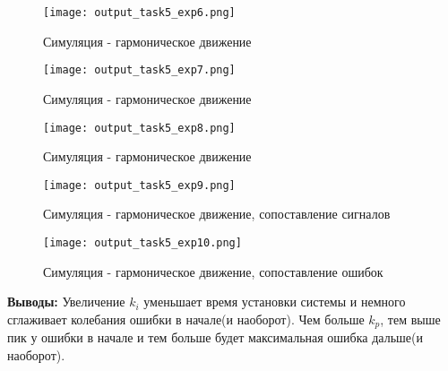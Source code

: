\begin{figure}[ht]
  \centering
  \texttt{[image: output\_task5\_exp6.png]}
\caption{Симуляция - гармоническое движение}
\end{figure}

\newpage
\begin{figure}[ht]
  \centering
  \texttt{[image: output\_task5\_exp7.png]}
\caption{Симуляция - гармоническое движение}
\end{figure}

\begin{figure}[ht]
  \centering
  \texttt{[image: output\_task5\_exp8.png]}
\caption{Симуляция - гармоническое движение}
\end{figure}

\newpage
\begin{figure}[ht]
  \centering
  \texttt{[image: output\_task5\_exp9.png]}
\caption{Симуляция - гармоническое движение, сопоставление сигналов}
\end{figure}

\begin{figure}[ht]
  \centering
  \texttt{[image: output\_task5\_exp10.png]}
\caption{Симуляция - гармоническое движение, сопоставление ошибок}
\end{figure}



\newpage
\textbf{Выводы:}  Увеличение $k_i$ уменьшает время установки системы и немного сглаживает колебания ошибки в начале(и наоборот). 
Чем больше $k_p$, тем выше пик у ошибки в начале и тем больше будет максимальная ошибка дальше(и наоборот).

\endinput
